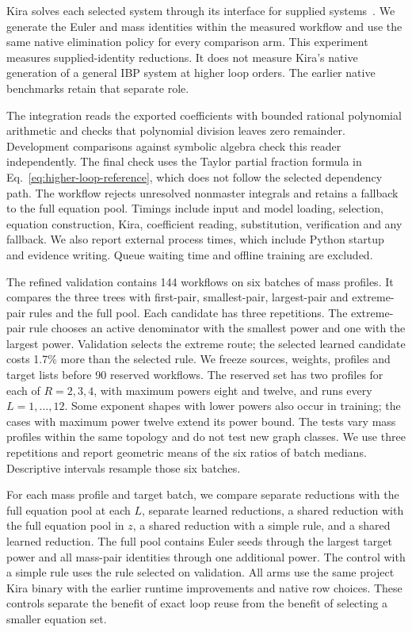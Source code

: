 Kira solves each selected system through its interface for supplied
systems~\cite{Kira2,Kira3}. We generate the Euler and mass identities
within the measured workflow and use the same native elimination policy
for every comparison arm. This experiment measures supplied-identity
reductions. It does not measure Kira's native generation of a general
IBP system at higher loop orders. The earlier native benchmarks retain that separate
role.

The integration reads the exported coefficients with bounded rational
polynomial arithmetic and checks that polynomial division leaves zero
remainder. Development comparisons against symbolic algebra check this
reader independently. The final check uses the Taylor partial fraction
formula in Eq.~\eqref{eq:higher-loop-reference}, which does not follow the
selected dependency path. The workflow rejects unresolved nonmaster
integrals and retains a fallback to the full equation pool. Timings include input and
model loading, selection, equation construction, Kira, coefficient reading,
substitution, verification and any fallback. We also report external
process times, which include Python startup and evidence writing.
Queue waiting time and offline training are excluded.

The refined validation contains 144 workflows on six batches of mass profiles.
It compares the three trees with first-pair, smallest-pair, largest-pair and
extreme-pair rules and the full pool. Each candidate has three repetitions.
The extreme-pair rule chooses an active denominator with the smallest
power and one with the largest power. Validation selects the
extreme route; the selected learned candidate costs
1.7\% more than the selected rule.
We freeze sources, weights, profiles and target lists before 90 reserved
workflows. The reserved set has two profiles for each of
\(R=2,3,4\), with maximum powers eight and twelve, and runs every
\(L=1,\ldots,12\). Some exponent shapes with lower powers also occur in
training; the cases with maximum power twelve extend its power bound. The tests vary
mass profiles within the same topology and do not test new graph classes.
We use three repetitions and report geometric means of the six ratios of
batch medians. Descriptive intervals resample those six batches.


For each mass profile and target batch, we compare separate reductions with the full equation pool at each \(L\), separate learned reductions, a shared reduction with the full equation pool in \(z\), a shared reduction with a simple rule, and a shared learned
reduction. The full pool contains Euler seeds through the largest target
power and all mass-pair identities through one additional power. The
control with a simple rule uses the rule selected on validation. All arms use the
same project Kira binary with the earlier runtime improvements and native
row choices. These controls separate the benefit of exact loop reuse from
the benefit of selecting a smaller equation set.

